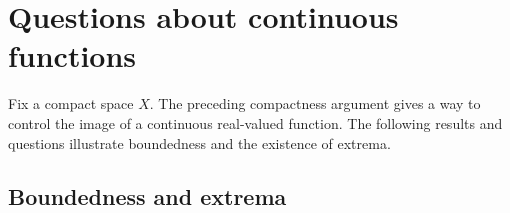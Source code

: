 \chapter{Questions about continuous functions}
\label{chap:continuous-functions}
Fix a compact space $X$. The preceding compactness argument gives a way to control the image of a continuous real-valued function. The following results and questions illustrate boundedness and the existence of extrema.

\section{Boundedness and extrema}

